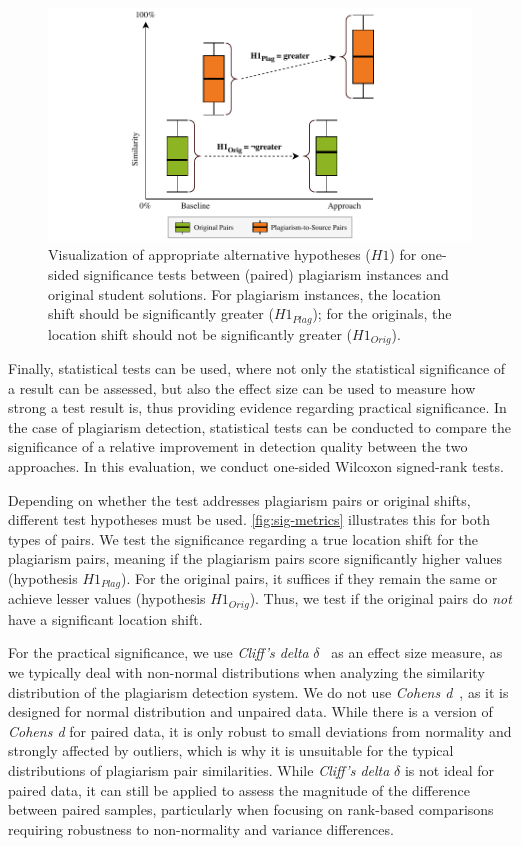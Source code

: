\begin{figure}
    \centering
    \includegraphics[width=0.95\linewidth]{figures/methodology/SigMetrics.pdf}
    \caption[Statistical Testing in Plagiarism Evaluations]{Visualization of appropriate alternative hypotheses ($H1$) for one-sided significance tests between (paired) plagiarism instances and original student solutions. For plagiarism instances, the location shift should be significantly greater ($H1_{Plag}$); for the originals, the location shift should not be significantly greater ($H1_{Orig}$).}
    \label{fig:sig-metrics}
\end{figure}

Finally, statistical tests can be used, where not only the statistical significance of a result can be assessed, but also the effect size can be used to measure how strong a test result is, thus providing evidence regarding practical significance.
In the case of plagiarism detection, statistical tests can be conducted to compare the significance of a relative improvement in detection quality between the two approaches. 
In this evaluation, we conduct one-sided Wilcoxon signed-rank tests.

Depending on whether the test addresses plagiarism pairs or original shifts, different test hypotheses must be used. \autoref{fig:sig-metrics} illustrates this for both types of pairs. We test the significance regarding a true location shift for the plagiarism pairs, meaning if the plagiarism pairs score significantly higher values (hypothesis $H1_{Plag}$). For the original pairs, it suffices if they remain the same or achieve lesser values (hypothesis $H1_{Orig}$). Thus, we test if the original pairs do \textit{not} have a significant location shift.

For the practical significance, we use \textit{Cliff's delta} $\delta$~\cite{Cliff1993} as an effect size measure, as we typically deal with non-normal distributions when analyzing the similarity distribution of the plagiarism detection system. We do not use \textit{Cohens d}~\cite{Cohen1988}, as it is designed for normal distribution and unpaired data.
While there is a version of \textit{Cohens d} for paired data, it is only robust to small deviations from normality and strongly affected by outliers, which is why it is unsuitable for the typical distributions of plagiarism pair similarities. While \textit{Cliff's delta} $\delta$ is not ideal for paired data, it can still be applied to assess the magnitude of the difference between paired samples, particularly when focusing on rank-based comparisons requiring robustness to non-normality and variance differences.

